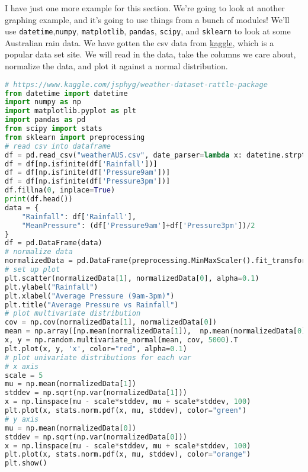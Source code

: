 \documentclass[11pt, twoside, reqno]{book}
\begin{document}
I have just one more example for this section. We're going to look at another graphing example, and it's going to use things from a bunch of modules! We'll use \texttt{datetime},\texttt{numpy}, \texttt{matplotlib}, \texttt{pandas}, \texttt{scipy}, and \texttt{sklearn} to look at some Australian rain data. We have gotten the csv data from \href{https://www.kaggle.com/jsphyg/weather-dataset-rattle-package}{kaggle}, which is a popular data set site. We will read in the data, take the columns we care about, normalize the data, and plot it against a normal distribution.
\begin{lstlisting}[language=Python]
# https://www.kaggle.com/jsphyg/weather-dataset-rattle-package
from datetime import datetime
import numpy as np
import matplotlib.pyplot as plt
import pandas as pd
from scipy import stats
from sklearn import preprocessing
# read csv into dataframe
df = pd.read_csv("weatherAUS.csv", date_parser=lambda x: datetime.strptime(x, "%Y-%m-%d"))
df = df[np.isfinite(df['Rainfall'])]
df = df[np.isfinite(df['Pressure9am'])]
df = df[np.isfinite(df['Pressure3pm'])]
df.fillna(0, inplace=True)
print(df.head())
data = {
    "Rainfall": df['Rainfall'], 
    "MeanPressure": (df['Pressure9am']+df['Pressure3pm'])/2
}
df = pd.DataFrame(data)
# normalize data
normalizedData = pd.DataFrame(preprocessing.MinMaxScaler().fit_transform(df))
# set up plot
plt.scatter(normalizedData[1], normalizedData[0], alpha=0.1)
plt.ylabel("Rainfall")
plt.xlabel("Average Pressure (9am-3pm)")
plt.title("Average Pressure vs Rainfall")
# plot multivariate distribution
cov = np.cov(normalizedData[1], normalizedData[0])
mean = np.array([np.mean(normalizedData[1]),  np.mean(normalizedData[0])])
x, y = np.random.multivariate_normal(mean, cov, 5000).T
plt.plot(x, y, 'x', color="red", alpha=0.1)
# plot univariate distributions for each var
# x axis
scale = 5
mu = np.mean(normalizedData[1])
stddev = np.sqrt(np.var(normalizedData[1]))
x = np.linspace(mu - scale*stddev, mu + scale*stddev, 100)
plt.plot(x, stats.norm.pdf(x, mu, stddev), color="green")
# y axis
mu = np.mean(normalizedData[0])
stddev = np.sqrt(np.var(normalizedData[0]))
x = np.linspace(mu - scale*stddev, mu + scale*stddev, 100)
plt.plot(x, stats.norm.pdf(x, mu, stddev), color="orange")
plt.show()
\end{lstlisting}
\end{document}

